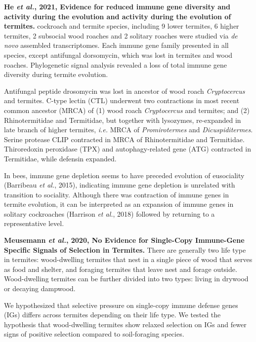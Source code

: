 \documentclass[11pt]{article}
\begin{document}
\begin{sloppypar}
\textbf{He \textit{et al.}, 2021, Evidence for reduced immune gene diversity and activity during the evolution and activity during the evolution of termites.}  cockroach and termite species, including 9 lower termites, 6 higher termites, 2 subsocial wood roaches and 2 solitary roaches were studied via \textit{de novo} assembled transcriptomes. 
Each immune gene family presented in all species, except antifungal dorsomycin, which was lost in termites and wood roaches. 
Phylogenetic signal analysis revealed a loss of total immune gene diversity during termite evolution. 
\par
Antifungal peptide drosomycin was lost in ancestor of wood roach \textit{Cryptocercus} and termites. 
C-type lectin (CTL) underwent two contractions in most recent common ancestor (MRCA) of (1) wood roach \textit{Cryptocercus} and termites; and (2) Rhinotermitidae and Termitidae, but together with lysozymes, re-expanded in late branch of higher termites, \textit{i.e.} MRCA of \textit{Promirotermes} and \textit{Dicuspiditermes}. 
Serine protease CLIP contracted in MRCA of Rhinotermitidae and Termitidae. 
Thiroredoxin peroxidase (TPX) and autophagy-related gene (ATG) contracted in Termitidae, while defensin expanded. 
\par
In bees, immune gene depletion seems to have preceded evolution of eusociality (Barribeau \textit{et al.}, 2015), indicating immune gene depletion is unrelated with transition to sociality. 
Although there was contraction of immune genes in termite evolution, it can be interpreted as an expansion of immune genes in solitary cockroaches (Harrison \textit{et al.}, 2018) followed by returning to a representative level.
\par
\textbf{Meusemann \textit{et al.}, 2020, No Evidence for Single-Copy Immune-Gene Specific Signals of Selection in Termites.} \newline
There are generally two life type in termites: wood-dwelling termites that nest in a single piece of wood that serves as food and shelter, and foraging termites that leave nest and forage outside. 
Wood-dwelling termites can be further divided into two types: living in drywood or decaying dampwood. 
\par
We hypothesized that selective pressure on single-copy immune defense genes (IGs) differs across termites depending on their life type. 
We tested the hypothesis that wood-dwelling termites show relaxed selection on IGs and fewer signs of positive selection compared to soil-foraging species. 

\end{sloppypar}
\end{document}
